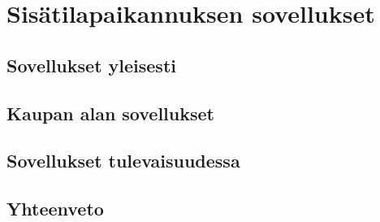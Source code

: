 \section{Sisätilapaikannuksen sovellukset}
\subsection{Sovellukset yleisesti}
\subsection{Kaupan alan sovellukset}
\subsection{Sovellukset tulevaisuudessa}
\subsection{Yhteenveto}